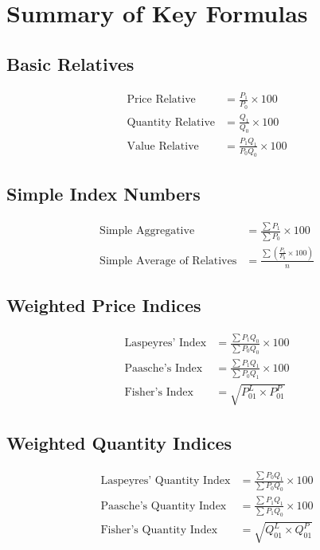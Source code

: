 \documentclass[twoside]{book}
\begin{document}
\section{Summary of Key Formulas}

\subsection{Basic Relatives}
\begin{align}
\text{Price Relative} &= \frac{P_1}{P_0} \times 100 \\
\text{Quantity Relative} &= \frac{Q_1}{Q_0} \times 100 \\
\text{Value Relative} &= \frac{P_1 Q_1}{P_0 Q_0} \times 100
\end{align}

\subsection{Simple Index Numbers}
\begin{align}
\text{Simple Aggregative} &= \frac{\sum P_1}{\sum P_0} \times 100 \\
\text{Simple Average of Relatives} &= \frac{\sum \left(\frac{P_1}{P_0} \times 100\right)}{n}
\end{align}

\subsection{Weighted Price Indices}
\begin{align}
\text{Laspeyres' Index} &= \frac{\sum P_1 Q_0}{\sum P_0 Q_0} \times 100 \\
\text{Paasche's Index} &= \frac{\sum P_1 Q_1}{\sum P_0 Q_1} \times 100 \\
\text{Fisher's Index} &= \sqrt{P_{01}^L \times P_{01}^P}
\end{align}

\subsection{Weighted Quantity Indices}
\begin{align}
\text{Laspeyres' Quantity Index} &= \frac{\sum P_0 Q_1}{\sum P_0 Q_0} \times 100 \\
\text{Paasche's Quantity Index} &= \frac{\sum P_1 Q_1}{\sum P_1 Q_0} \times 100 \\
\text{Fisher's Quantity Index} &= \sqrt{Q_{01}^L \times Q_{01}^P}
\end{align}
\end{document}
